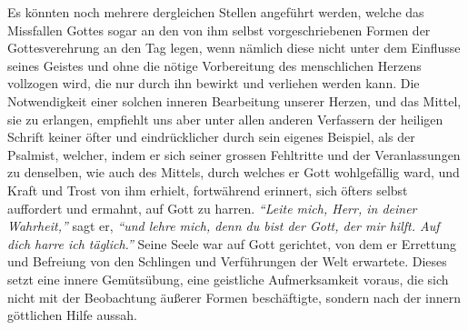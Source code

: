 Es könnten noch mehrere dergleichen Stellen
angeführt werden, welche das
Missfallen Gottes sogar an den von ihm selbst vorgeschriebenen Formen der
Gottesverehrung an den Tag legen, wenn nämlich diese nicht
unter dem Einflusse seines Geistes und ohne die nötige Vorbereitung des
menschlichen Herzens vollzogen wird, die nur durch ihn bewirkt und verliehen
werden kann. Die Notwendigkeit einer solchen inneren Bearbeitung unserer Herzen,
und das Mittel, sie zu erlangen, empfiehlt
uns aber unter allen anderen Verfassern der heiligen Schrift keiner öfter und
eindrücklicher durch sein eigenes Beispiel, als der
Psalmist, welcher, indem
er sich seiner grossen Fehltritte und der Veranlassungen zu denselben, wie auch
des Mittels, durch welches er Gott wohlgefällig ward, und Kraft und Trost von
ihm erhielt, fortwährend erinnert, sich öfters selbst auffordert und ermahnt,
auf Gott zu harren.
\textit{"`Leite mich, Herr, in deiner Wahrheit,"'} sagt er,
\textit{"`und lehre mich, denn du bist der Gott, der mir hilft. Auf dich harre
ich täglich."'}
Seine Seele war auf Gott gerichtet, von dem er
Errettung und Befreiung von den Schlingen und Verführungen der Welt erwartete.
Dieses setzt eine innere Gemütsübung, eine geistliche Aufmerksamkeit voraus,
die sich nicht mit der Beobachtung äußerer Formen beschäftigte, sondern nach
der innern göttlichen Hilfe aussah.

\medskip

